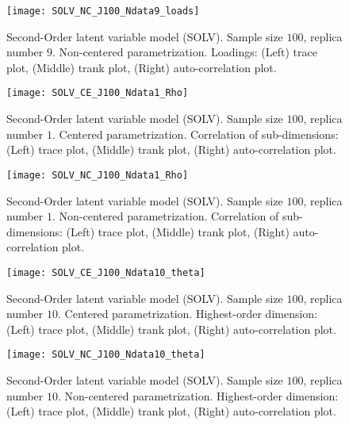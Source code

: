 %
\begin{figure}[H]
	\centering
	\texttt{[image: SOLV\_NC\_J100\_Ndata9\_loads]}
	\caption[Second-Order latent variable model (SOLV). Sample size $100$, replica number $9$. Non-centered parametrization. Loadings. Trace, trank and auto-correlation plots.]%
	{Second-Order latent variable model (SOLV). Sample size $100$, replica number $9$. Non-centered parametrization. Loadings: (Left) trace plot, (Middle) trank plot, (Right) auto-correlation plot.}
	\label{fig:SOLV_NC_chains1}
\end{figure}
%
\begin{figure}[H]
	\centering
	\texttt{[image: SOLV\_CE\_J100\_Ndata1\_Rho]}
	\caption[Second-Order latent variable model (SOLV). Sample size $100$, replica number $1$. Centered parametrization. Correlation of sub-dimensions. Trace, trank and auto-correlation plots.]%
	{Second-Order latent variable model (SOLV). Sample size $100$, replica number $1$. Centered parametrization. Correlation of sub-dimensions: (Left) trace plot, (Middle) trank plot, (Right) auto-correlation plot.}
	\label{fig:SOLV_CE_chains2}
\end{figure}
%
\begin{figure}[H]
	\centering
	\texttt{[image: SOLV\_NC\_J100\_Ndata1\_Rho]}
	\caption[Second-Order latent variable model (SOLV). Sample size $100$, replica number $1$. Non-centered parametrization. Correlation of sub-dimensions. Trace, trank and auto-correlation plots.]%
	{Second-Order latent variable model (SOLV). Sample size $100$, replica number $1$. Non-centered parametrization. Correlation of sub-dimensions: (Left) trace plot, (Middle) trank plot, (Right) auto-correlation plot.}
	\label{fig:SOLV_NC_chains2}
\end{figure}
%
\begin{figure}[H]
	\centering
	\texttt{[image: SOLV\_CE\_J100\_Ndata10\_theta]}
	\caption[Second-Order latent variable model (SOLV). Sample size $100$, replica number $10$. Centered parametrization. Highest-order dimension. Trace, trank and auto-correlation plots.]%
	{Second-Order latent variable model (SOLV). Sample size $100$, replica number $10$. Centered parametrization. Highest-order dimension: (Left) trace plot, (Middle) trank plot, (Right) auto-correlation plot.}
	\label{fig:SOLV_CE_chains3}
\end{figure}
%
\begin{figure}[H]
	\centering
	\texttt{[image: SOLV\_NC\_J100\_Ndata10\_theta]}
	\caption[Second-Order latent variable model (SOLV). Sample size $100$, replica number $10$. Non-centered parametrization. Highest-order dimension. Trace, trank and auto-correlation plots.]%
	{Second-Order latent variable model (SOLV). Sample size $100$, replica number $10$. Non-centered parametrization. Highest-order dimension: (Left) trace plot, (Middle) trank plot, (Right) auto-correlation plot.}
	\label{fig:SOLV_NC_chains3}
\end{figure}
